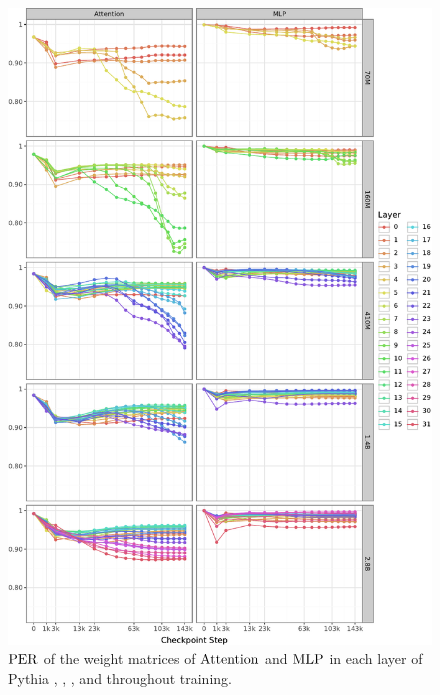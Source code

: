 \begin{figure}[h!]
    \centering
    \includegraphics[width=0.9\linewidth]{chapters/tending-towards-stability/figures/per_weight_lines.pdf}
    \vspace{-5pt}
    \caption{$\mathrm{PER}$ of the weight matrices of $\mathrm{Attention}$ and $\mathrm{MLP}$ in each layer of Pythia , , ,  and  throughout training.}%
    \label{fig:per_weight-layer-wise-lines}
\end{figure}
\clearpage

